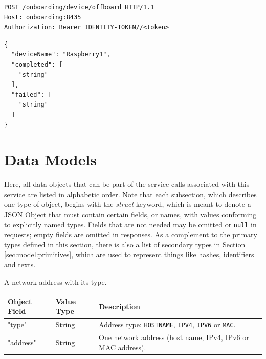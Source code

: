 \documentclass[a4paper]{arrowhead}
\newcommand{\oref}[1]{{\textcolor{ArrowheadBlue}{\hyperref[sec:operations:#1]{#1}}}}
\newcommand{\pref}[1]{{\textcolor{ArrowheadGrey}{\hyperref[sec:model:primitives:#1]{#1}}}}
\begin{document}
\begin{lstlisting}[label={lst:offboard-device},caption={An \oref{offboard-device} invocation.}]
POST /onboarding/device/offboard HTTP/1.1
Host: onboarding:8435
Authorization: Bearer IDENTITY-TOKEN//<token>
\end{lstlisting}

\begin{lstlisting}[label={lst:offboard-device-resp},caption={An \oref{offboard-device} response.}]
{
  "deviceName": "Raspberry1",
  "completed": [
    "string"
  ],
  "failed": [
    "string"
  ]
}
\end{lstlisting}

\newpage

\section{Data Models}
\label{sec:model}

Here, all data objects that can be part of the service calls associated with this service are listed in alphabetic order.
Note that each subsection, which describes one type of object, begins with the \textit{struct} keyword, which is meant to denote a JSON \pref{Object} that must contain certain fields, or names, with values conforming to explicitly named types.
Fields that are not needed may be omitted or \texttt{null} in requests; empty fields are omitted in responses.
As a complement to the primary types defined in this section, there is also a list of secondary types in Section \ref{sec:model:primitives}, which are used to represent things like hashes, identifiers and texts.


A network address with its type.


\noindent\begin{tabularx}{\textwidth}{| >{\raggedright\arraybackslash}p{3.9cm} | >{\raggedright\arraybackslash\small}p{5.3cm} | X |} \hline
\rowcolor{gray!33} Object Field & Value Type & Description \\ \hline
"type" & \pref{String} & Address type: \texttt{HOSTNAME}, \texttt{IPV4}, \texttt{IPV6} or \texttt{MAC}. \\ \hline
"address" & \pref{String} & One network address (host name, IPv4, IPv6 or MAC address). \\ \hline
\end{tabularx}



\end{document}
